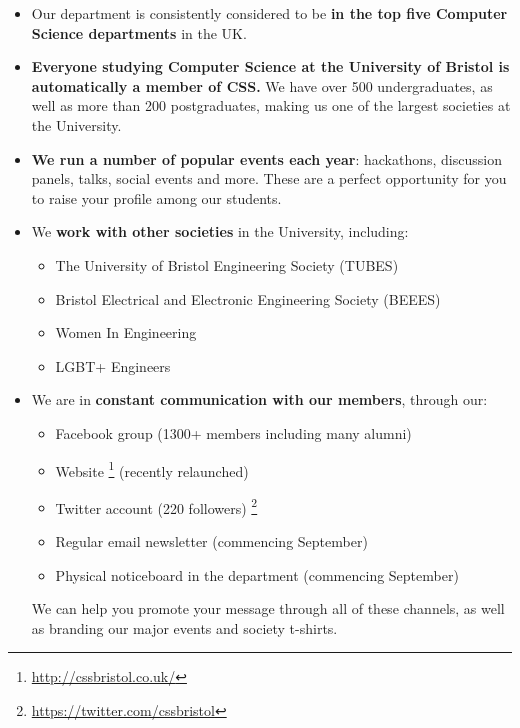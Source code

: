 \documentclass[]{article}
\begin{document}
\begin{multicols}{2}
  \begin{itemize}
      \item Our department is consistently considered to be \textbf{in the top five Computer Science departments} in the UK.
      \item \textbf{Everyone studying Computer Science at the University of Bristol is automatically a member of CSS.} We have over 500 undergraduates, as well as more than 200 postgraduates, making us one of the largest societies at the University.
      \item \textbf{We run a number of popular events each year}: hackathons, discussion panels, talks, social events and more. These are a perfect opportunity for you to raise your profile among our students.
      \item We \textbf{work with other societies} in the University, including:
              \begin{itemize}
                  \item The University of Bristol Engineering Society (TUBES)
                  \item Bristol Electrical and Electronic Engineering Society (BEEES)
                  \item Women In Engineering
                  \item LGBT+ Engineers
              \end{itemize}
      \item We are in \textbf{constant communication with our members}, through our:
              \begin{itemize}
                  \item Facebook group (1300+ members including many alumni)
                  \item Website \footnote{\url{http://cssbristol.co.uk/}} (recently relaunched)
                  \item Twitter account (220 followers) \footnote{\url{https://twitter.com/cssbristol}}
                  \item Regular email newsletter (commencing September)
                  \item Physical noticeboard in the department (commencing September)
              \end{itemize}
           We can help you promote your message through all of these channels, as well as branding our major events and society t-shirts.
  \end{itemize}

\end{multicols}
\end{document}
